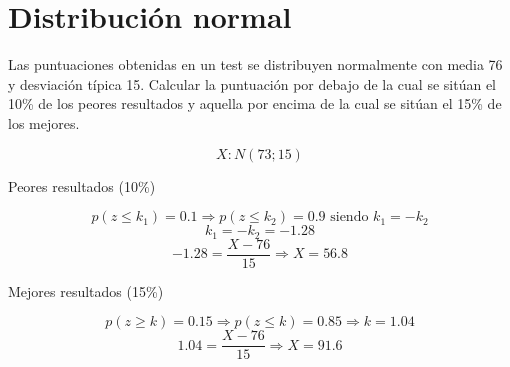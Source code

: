 \section{Distribución normal}
\begin{exercise}
  Las puntuaciones obtenidas en un test se distribuyen normalmente con media 76 y desviación típica 15. Calcular la puntuación por debajo de la cual se sitúan el 10\% de los peores resultados y aquella por encima de la cual se sitúan el 15\% de los mejores.

  \tcblower

  \[ X:N(73;15) \]

  Peores resultados (10\%) 

  \[p(z \leq k_1)=0.1 \Rightarrow p(z \leq k_2)=0.9 \text{ siendo } k_1=-k_2\]
  \[k_1=-k_2=-1.28\]
  \[-1.28=\dfrac{X-76}{15} \Rightarrow X=56.8\]

  Mejores resultados (15\%) 

  \[p(z \geq k)=0.15 \Rightarrow p(z \leq k)=0.85 \Rightarrow k=1.04\]
  \[1.04=\dfrac{X-76}{15} \Rightarrow X=91.6\]
    
\end{exercise}

